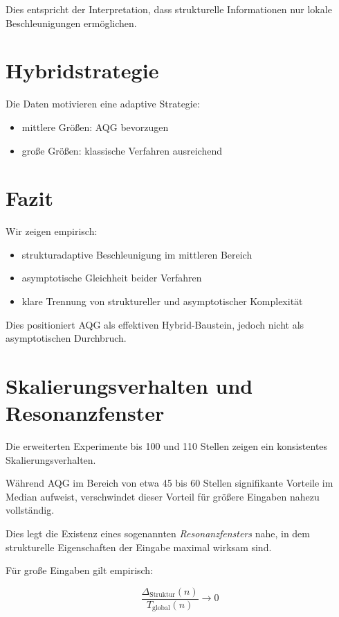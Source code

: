 \documentclass[11pt,a4paper]{article}
\begin{document}
	Dies entspricht der Interpretation, dass strukturelle Informationen nur lokale Beschleunigungen ermöglichen.
	
	\section{Hybridstrategie}
	
	Die Daten motivieren eine adaptive Strategie:
	
	\begin{itemize}
		\item mittlere Größen: AQG bevorzugen
		\item große Größen: klassische Verfahren ausreichend
	\end{itemize}
	
	\section{Fazit}
	
	Wir zeigen empirisch:
	
	\begin{itemize}
		\item strukturadaptive Beschleunigung im mittleren Bereich
		\item asymptotische Gleichheit beider Verfahren
		\item klare Trennung von struktureller und asymptotischer Komplexität
	\end{itemize}
	
	Dies positioniert AQG als effektiven Hybrid-Baustein, jedoch nicht als asymptotischen Durchbruch.
	
	\section{Skalierungsverhalten und Resonanzfenster}
	
	Die erweiterten Experimente bis 100 und 110 Stellen zeigen ein konsistentes Skalierungsverhalten.
	
	Während AQG im Bereich von etwa 45 bis 60 Stellen signifikante Vorteile im Median aufweist, verschwindet dieser Vorteil für größere Eingaben nahezu vollständig.
	
	Dies legt die Existenz eines sogenannten \emph{Resonanzfensters} nahe, in dem strukturelle Eigenschaften der Eingabe maximal wirksam sind.
	
	Für große Eingaben gilt empirisch:
	
	\begin{equation}
		\frac{\Delta_{\text{Struktur}}(n)}{T_{\text{global}}(n)} \to 0
	\end{equation}
	
\end{document}

